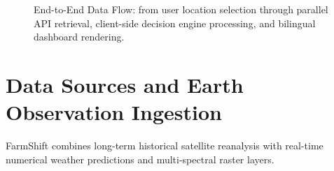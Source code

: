 \documentclass[11pt,a4paper]{report}
\begin{document}
\begin{figure}[htbp]
{
}%
\caption{End-to-End Data Flow: from user location selection through parallel API retrieval, client-side decision engine processing, and bilingual dashboard rendering.}
\label{fig:dataflow}
\end{figure}

\chapter{Data Sources and Earth Observation Ingestion}

FarmShift combines long-term historical satellite reanalysis with real-time numerical weather predictions and multi-spectral raster layers.
\end{document}
